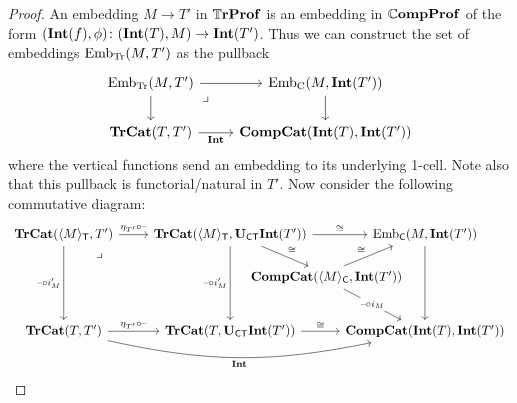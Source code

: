 \documentclass[12pt,oneside,article,draft]{memoir}
\begin{document}
\begin{proof}
   An embedding $M\to T'$ in $\mathbb{T}\mathbf{rProf}$ is an embedding in $\mathbb{C}\mathbf{ompProf}$ of the form
   $(\mathbf{Int}(f),\phi)\colon(\mathbf{Int}(T),M)\to\mathbf{Int}(T')$. Thus we can construct the set of embeddings
   $\mathrm{Emb}_{\mathrm{Tr}}(M,T')$ as the pullback
   \begin{equation}\label{eq:Emb_Tr}
      \begin{tikzcd}
         \Emb_{\mathrm{Tr}}(M,T') \ar[r] \ar[d] \ar[dr,phantom,"\lrcorner" very near start]
            & \Emb_{\mathrm{C}}(M,\Int(T')) \ar[d] \\
         \TrCat(T,T') \ar[r,"\Int"'] & \CompCat(\Int(T),\Int(T'))
      \end{tikzcd}
   \end{equation}
   where the vertical functions send an embedding to its underlying 1-cell. Note also that this
   pullback is functorial/natural in $T'$. Now consider the following commutative diagram:
   \begin{equation*}
      \begin{tikzcd}[column sep=.1cm]
         \TrCat(\Col{M}_{\MTCfont{T}},T')
               \ar[rr,"\eta_{T'}\circ\textrm{--}"]
               \ar[dd,"\textrm{--}\circ i'_M"']
               \ar[ddrr,phantom,"\lrcorner" very near start]
            &\hspace{.3cm}&
               \TrCat(\Col{M}_{\MTCfont{T}},\UCT\Int(T'))
               \ar[dr, end anchor = {[xshift=-.2cm]north west},"\iso"]
               \ar[dd,"\textrm{--}\circ i'_M"']
               \ar[rr,"\iso"]
            &&\Emb_{\MTCfont{C}}(M,\Int(T')) \ar[dd]
            \\[-.5ex]
            &&&\parbox{.25cm}{~\hspace{-2cm}$\CompCat(\Col{M}_{\MTCfont{C}},\Int(T'))$}
            \ar[ur,start anchor={[xshift=.2cm]north east},"\iso"]
            \ar[dr,start anchor={[xshift=.2cm]south east},"\textrm{--}\circ i_M" description]
            \\[1.5ex]
         \TrCat(T,T')
               \ar[rr,"\eta_{T'}\circ\textrm{--}"]
               \ar[rrrr,bend right=12,"\Int"']
            && \TrCat(T,\UCT\Int(T'))
               \ar[rr,"\iso"] 
            && \CompCat(\Int(T),\Int(T'))
      \end{tikzcd}
   \end{equation*}

\end{proof}
\end{document}
